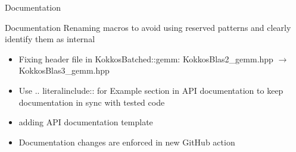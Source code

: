 \begin{frame}[fragile]

  {\Huge Documentation}

  \vspace{10pt}

\end{frame}

\begin{frame}[fragile]{Documentation}
  Renaming macros to avoid using reserved patterns and clearly identify them as internal
  \begin{itemize}
    \item Fixing header file in {\ttfamily KokkosBatched::gemm}: {\ttfamily KokkosBlas2\_gemm.hpp} $\rightarrow$ {\ttfamily KokkosBlas3\_gemm.hpp}
    \item Use {\ttfamily .. literalinclude::} for Example section in API documentation to keep documentation in sync with tested code 
    \item adding API documentation template
    \item Documentation changes are enforced in new {GitHub} action
  \end{itemize}
\end{frame}
